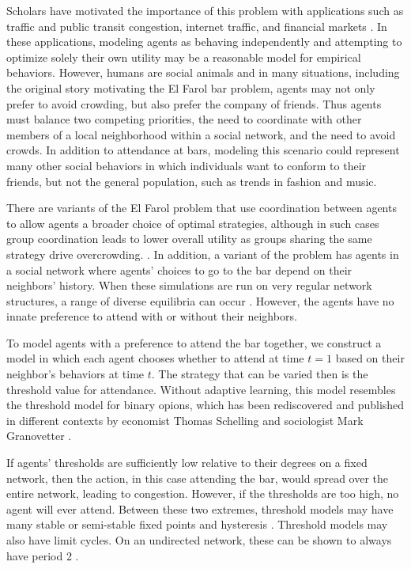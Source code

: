 \documentclass[12pt]{article}
\begin{document}
Scholars have motivated the importance of this problem with applications such as traffic and public transit congestion, internet traffic, and financial markets \cite{zambrano:2004} \cite{chen:2012}.  In these applications, modeling agents as behaving independently and attempting to optimize solely their own utility may be a reasonable model for empirical behaviors.  However, humans are social animals and in many situations, including the original story motivating the El Farol bar problem, agents may not only prefer to avoid crowding, but also prefer the company of friends.  Thus agents must balance two competing priorities, the need to coordinate with other members of a local neighborhood within a social network, and the need to avoid crowds.  In addition to attendance at bars, modeling this scenario could represent many other social behaviors in which individuals want to conform to their friends, but not the general population, such as trends in fashion and music.

There are variants of the El Farol problem that use coordination between agents to allow agents a broader choice of optimal strategies, although in such cases group coordination leads to lower overall utility as groups sharing the same strategy drive overcrowding. \cite{collins:2017} \cite{wilensky:2015}.  In addition, a variant of the problem has agents in a social network where agents' choices to go to the bar depend on their neighbors' history.   When these simulations are run on very regular network structures, a range of diverse equilibria can occur \cite{chen:2012}.  However, the agents have no innate preference to attend with or without their neighbors.

To model agents with a preference to attend the bar together, we construct a model in which each agent chooses whether to attend at time $t = 1$ based on their neighbor's behaviors at time $t$.  The strategy that can be varied then is the threshold value for attendance.  Without adaptive learning, this model resembles the threshold model for binary opions, which has been rediscovered and published in different contexts by economist Thomas Schelling \cite{schelling:1978} and sociologist Mark Granovetter \cite{granovetter:1978} \cite{grabish:2020}.  

If agents' thresholds are sufficiently low relative to their degrees on a fixed network, then the action, in this case attending the bar, would spread over the entire network, leading to congestion.  However, if the thresholds are too high, no agent will ever attend.  Between these two extremes, threshold models may have many stable or semi-stable fixed points \cite{adam:2012} and hysteresis \cite{Wiedermann_2020}.  Threshold models may also have limit cycles.  On an undirected network, these can be shown to always have period 2 \cite{grabish:2020} \cite{goles:1980}.
\end{document}
